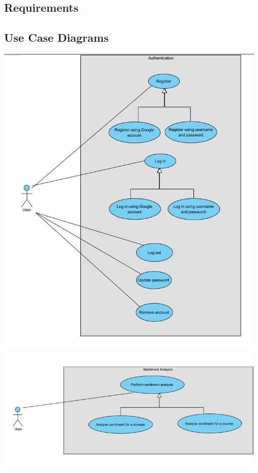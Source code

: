 \documentclass[12pt]{article}
\begin{document}
\subsection{Requirements}

\subsection{Use Case Diagrams}
\begin{center}
  \includegraphics[width=13cm]{../../Images/uc1.1.png}
  \includegraphics[width=13cm]{../../Images/uc1.2.png}

\end{center}
\end{document}
